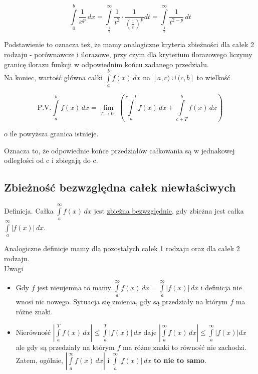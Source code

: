$$ \int\limits_{0}^{b} \frac{1}{x^p} \,dx = \int\limits_{\frac{1}{b}}^{\infty} \frac{1}{t^2} \cdot \frac{1}{ \left( \frac{1}{t} \right)^p } dt
= \int\limits_{\frac{1}{b}}^{\infty} \frac{1}{t^{2 - p}} \,dt $$

Podstawienie to oznacza też, że mamy analogiczne kryteria zbieżności dla całek 2 rodzaju - porównawcze i ilorazowe, przy
czym dla kryterium ilorazowego liczymy granicę ilorazu funkcji w odpowiednim końcu zadanego przedziału. \\

Na koniec, wartość główna całki $ \int\limits_{a}^{b} f(x) \,dx $ na $[a,c)\cup(c,b]$ to wielkość

$$ \textrm{P.V.} \int\limits_{a}^{b} f(x) \,dx = \lim_{T \to 0^+} 
\left( \int\limits_{a}^{c - T} f(x) \,dx + \int\limits_{c + T}^{b} f(x) \,dx \right) $$

o ile powyższa granica istnieje.

Oznacza to, że odpowiednie końce przedziałów całkowania są w jednakowej odległości od c i zbiegają do c.

\subsection*{Zbieżność bezwzględna całek niewłaściwych}

Definicja. Całka $ \int\limits_{a}^{\infty} f(x) \,dx $ jest \underline{zbieżna bezwzględnie}, gdy zbieżna jest całka
$ \int\limits_{a}^{\infty} |f(x)| \,dx $.

Analogiczne definicje mamy dla pozostałych całek 1 rodzaju oraz dla całek 2 rodzaju. \\

Uwagi

\begin{itemize}
    \item Gdy $f$ jest nieujemna to mamy $ \int\limits_{a}^{\infty} f(x) \,dx = \int\limits_{a}^{\infty} |f(x)| \,dx $
    i definicja nie wnosi nic nowego. Sytuacja się zmienia, gdy są przedziały na którym $f$ ma różne znaki.
    
    \item Nierówność $ \left| \int\limits_{a}^{T} f(x) \,dx \right| \leq \int\limits_{a}^{T} |f(x)| \,dx $ daje
    $ \left| \int\limits_{a}^{\infty} f(x) \,dx \right| \leq \int\limits_{a}^{\infty} |f(x)| dx $ ale gdy są przedziały
    na którym $f$ ma różne znaki to równość nie zachodzi.
    Zatem, ogólnie, $ \left| \int\limits_{a}^{\infty} f(x) \,dx \right| $ i $ \int\limits_{a}^{\infty} |f(x)| \,dx $
    \textbf{to nie to samo}. \\
\end{itemize}

